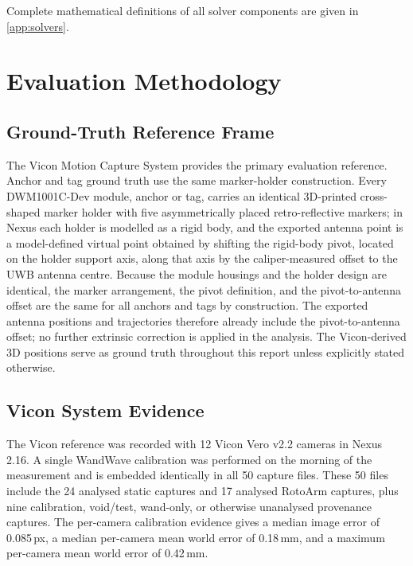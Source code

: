 \documentclass[11pt,a4paper]{article}
\begin{document}
Complete mathematical definitions of all solver components are given in \cref{app:solvers}.


\section{Evaluation Methodology}
\label{sec:coord}

\subsection{Ground-Truth Reference Frame}

The Vicon Motion Capture System provides the primary evaluation reference.
Anchor and tag ground truth use the same marker-holder construction.
Every DWM1001C-Dev module, anchor or tag, carries an identical
3D-printed cross-shaped marker holder with five asymmetrically placed
retro-reflective markers; in Nexus each holder is modelled as a rigid
body, and the exported antenna point is a model-defined virtual point
obtained by shifting the rigid-body pivot, located on the holder support
axis, along that axis by the caliper-measured offset to the UWB antenna
centre.
Because the module housings and the holder design are identical, the
marker arrangement, the pivot definition, and the pivot-to-antenna
offset are the same for all anchors and tags by construction.
The exported antenna positions and trajectories therefore already
include the pivot-to-antenna offset; no further extrinsic correction is
applied in the analysis.
The Vicon-derived 3D positions serve as ground truth throughout this report unless explicitly stated otherwise.

\subsection{Vicon System Evidence}
\label{sec:vicon_evidence}

The Vicon reference was recorded with 12 Vicon Vero v2.2 cameras in Nexus 2.16.
A single WandWave calibration was performed on the morning of the measurement and is embedded identically in all 50 capture files.
These 50 files include the 24 analysed static captures and 17 analysed RotoArm captures, plus nine calibration, void/test, wand-only, or otherwise unanalysed provenance captures.
The per-camera calibration evidence gives a median image error of 0.085\,px, a median per-camera mean world error of 0.18\,mm, and a maximum per-camera mean world error of 0.42\,mm.
\end{document}
